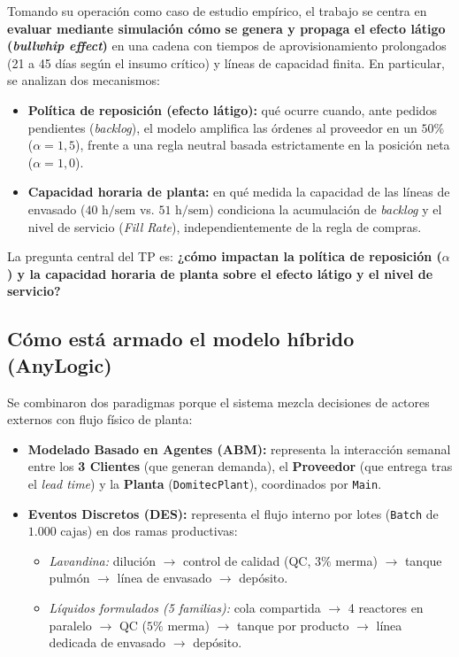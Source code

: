 \documentclass[11pt, a4paper]{article}
\begin{document}
Tomando su operación como caso de estudio empírico, el trabajo se centra en \textbf{evaluar mediante simulación cómo se genera y propaga el efecto látigo (\textit{bullwhip effect})} en una cadena con tiempos de aprovisionamiento prolongados (21 a 45 días según el insumo crítico) y líneas de capacidad finita. En particular, se analizan dos mecanismos:
\begin{itemize}[leftmargin=0.5cm, itemsep=2pt]
    \item \textbf{Política de reposición (efecto látigo):} qué ocurre cuando, ante pedidos pendientes (\textit{backlog}), el modelo amplifica las órdenes al proveedor en un $50\%$ ($\alpha = 1,5$), frente a una regla neutral basada estrictamente en la posición neta ($\alpha = 1,0$).
    \item \textbf{Capacidad horaria de planta:} en qué medida la capacidad de las líneas de envasado ($40\text{ h/sem}$ vs. $51\text{ h/sem}$) condiciona la acumulación de \textit{backlog} y el nivel de servicio (\textit{Fill Rate}), independientemente de la regla de compras.
\end{itemize}
La pregunta central del TP es: \textbf{¿cómo impactan la política de reposición ($\alpha$) y la capacidad horaria de planta sobre el efecto látigo y el nivel de servicio?}

\subsection{Cómo está armado el modelo híbrido (AnyLogic)}
Se combinaron dos paradigmas porque el sistema mezcla decisiones de actores externos con flujo físico de planta:
\begin{itemize}[leftmargin=0.5cm, itemsep=2pt]
    \item \textbf{Modelado Basado en Agentes (ABM):} representa la interacción semanal entre los \textbf{3 Clientes} (que generan demanda), el \textbf{Proveedor} (que entrega tras el \textit{lead time}) y la \textbf{Planta} (\texttt{DomitecPlant}), coordinados por \texttt{Main}.
    \item \textbf{Eventos Discretos (DES):} representa el flujo interno por lotes (\texttt{Batch} de $1.000$ cajas) en dos ramas productivas:
    \begin{itemize}[leftmargin=0.5cm, itemsep=1pt]
        \item \textit{Lavandina:} dilución $\rightarrow$ control de calidad (QC, $3\%$ merma) $\rightarrow$ tanque pulmón $\rightarrow$ línea de envasado $\rightarrow$ depósito.
        \item \textit{Líquidos formulados (5 familias):} cola compartida $\rightarrow$ 4 reactores en paralelo $\rightarrow$ QC ($5\%$ merma) $\rightarrow$ tanque por producto $\rightarrow$ línea dedicada de envasado $\rightarrow$ depósito.
    \end{itemize}
\end{itemize}
\end{document}
